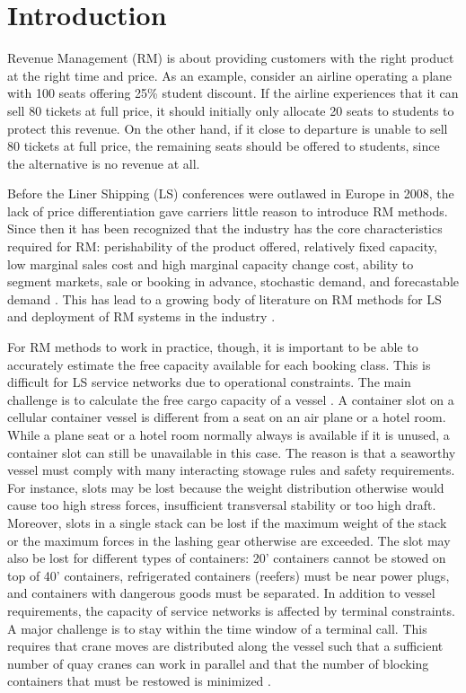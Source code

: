 \section{Introduction}

Revenue Management (RM) is about providing customers with the right product at the right time and price. As an example, consider an airline operating a plane with 100 seats offering 25\% student discount. If the airline experiences that it can sell 80 tickets at full price, it should initially only allocate 20 seats to students to protect this revenue. On the other hand, if it close to departure is unable to sell 80 tickets at full price, the remaining seats should be offered to students, since the alternative is no revenue at all.

Before the Liner Shipping (LS) conferences were outlawed in Europe in 2008, the lack of price differentiation gave carriers little reason to introduce RM methods. Since then it has been recognized that the industry has the core characteristics required for RM: perishability of the product offered, relatively fixed capacity, low marginal sales cost and high marginal capacity change cost, ability to segment markets, sale or booking in advance, stochastic demand, and forecastable demand \citep{Hellerman06}. This has lead to a growing body of literature on RM methods for LS  and deployment of RM systems in the industry \citep[e.g.,][]{Bingzhou08,Lu10,Zurheide15,Zhen17,Wang19a}.

For RM methods to work in practice, though, it is important to be able to accurately estimate the free capacity available for each booking class. This is difficult for LS service networks due to operational constraints. The main challenge is to calculate the free cargo capacity of a vessel \citep{HPS18}. A container slot on a cellular container vessel is different from a seat on an air plane or a hotel room. While a plane seat or a hotel room normally always is available if it is unused, a container slot can still be unavailable in this case. The reason is that a seaworthy vessel must comply with many interacting stowage rules and safety requirements. For instance, slots may be lost because the weight distribution otherwise would cause too high stress forces, insufficient transversal stability or too high draft. Moreover, slots in a single stack can be lost if the maximum weight of the stack or the maximum forces in the lashing gear otherwise are exceeded. The slot may also be lost for different types of containers: 20' containers cannot be stowed on top of 40' containers, refrigerated containers (reefers) must be near power plugs, and containers with dangerous goods must be separated. In addition to vessel requirements, the capacity of service networks is affected by terminal constraints. A major challenge is to stay within the time window of a terminal call. This requires that crane moves are distributed along the vessel such that a sufficient number of quay cranes can work in parallel and that the number of blocking containers that must be restowed is minimized \citep{JPAV18}.

